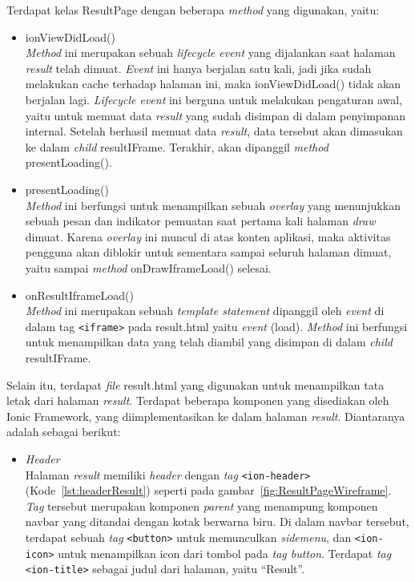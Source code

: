 \begin{enumerate}
	Terdapat kelas ResultPage dengan beberapa \textit{method} yang digunakan, yaitu:
	
	\begin{itemize}
		\item ionViewDidLoad() \\
		\textit{Method} ini merupakan sebuah \textit{lifecycle event} yang dijalankan saat halaman \textit{result} telah dimuat. \textit{Event} ini hanya berjalan satu kali, jadi jika sudah melakukan cache terhadap halaman ini, maka ionViewDidLoad() tidak akan berjalan lagi. \textit{Lifecycle event} ini berguna untuk melakukan pengaturan awal, yaitu untuk memuat data \textit{result} yang sudah disimpan di dalam penyimpanan internal. Setelah berhasil memuat data \textit{result}, data tersebut akan dimasukan ke dalam \textit{child} resultIFrame. Terakhir, akan dipanggil \textit{method} presentLoading().
		\item presentLoading() \\
		\textit{Method} ini berfungsi untuk menampilkan sebuah \textit{overlay} yang menunjukkan sebuah pesan dan indikator pemuatan saat pertama kali halaman \textit{draw} dimuat. Karena \textit{overlay} ini muncul di atas konten aplikasi, maka aktivitas pengguna akan diblokir untuk sementara sampai seluruh halaman dimuat, yaitu sampai \textit{method} onDrawIframeLoad() selesai. 
		\item onResultIframeLoad() \\
		\textit{Method} ini merupakan sebuah \textit{template statement} dipanggil oleh \textit{event} di dalam tag \texttt{<iframe>} pada result.html yaitu \textit{event} (load). \textit{Method} ini berfungsi untuk menampilkan data yang telah diambil yang disimpan di dalam \textit{child} resultIFrame.
	\end{itemize}
	
	Selain itu, terdapat \textit{file} result.html yang digunakan untuk menampilkan tata letak dari halaman \textit{result}. Terdapat beberapa komponen yang disediakan oleh Ionic Framework, yang diimplementasikan ke dalam halaman \textit{result}. Diantaranya adalah sebagai berikut:
	
	\begin{itemize}
		\item \textit{Header} \\
		Halaman \textit{result} memiliki \textit{header} dengan \textit{tag} \texttt{<ion-header>} (Kode~\ref{lst:headerResult}) seperti pada gambar~\ref{fig:ResultPageWireframe}. \textit{Tag} tersebut merupakan komponen \textit{parent} yang menampung komponen navbar yang ditandai dengan kotak berwarna biru. Di dalam navbar tersebut, terdapat sebuah \textit{tag} \texttt{<button>} untuk memunculkan \textit{sidemenu}, dan \texttt{<ion-icon>} untuk menampilkan icon dari tombol pada \textit{tag button}. Terdapat \textit{tag} \texttt{<ion-title>} sebagai judul dari halaman, yaitu ``Result''.


\end{itemize}
\end{enumerate}
